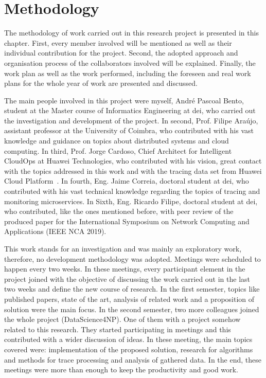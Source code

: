 \glsresetall
\chapter{Methodology}
\label{chap:methodology}

The methodology of work carried out in this research project is presented in this chapter. First, every member involved will be mentioned as well as their individual contribution for the project. Second, the adopted approach and organisation process of the collaborators involved will be explained. Finally, the work plan as well as the work performed, including the foreseen and real work plans for the whole year of work are presented and discussed.

The main people involved in this project were myself, André Pascoal Bento, student at the Master course of Informatics Engineering at \gls{dei}, who carried out the investigation and development of the project. In second, Prof. Filipe Araújo, assistant professor at the University of Coimbra, who contributed with his vast knowledge and guidance on topics about distributed systems and cloud computing. In third, Prof. Jorge Cardoso, Chief Architect for Intelligent CloudOps at Huawei Technologies, who contributed with his vision, great contact with the topics addressed in this work and with the tracing data set from Huawei Cloud Platform~\cite{huawei_cloud_platform}. In fourth, Eng. Jaime Correia, doctoral student at \gls{dei}, who contributed with his vast technical knowledge regarding the topics of tracing and monitoring microservices. In Sixth, Eng. Ricardo Filipe, doctoral student at \gls{dei}, who contributed, like the ones mentioned before, with peer review of the produced paper for the International Symposium on Network Computing and Applications (IEEE NCA 2019).

This work stands for an investigation and was mainly an exploratory work, therefore, no development methodology was adopted. Meetings were scheduled to happen every two weeks. In these meetings, every participant element in the project joined with the objective of discussing the work carried out in the last two weeks and define the new course of research. In the first semester, topics like published papers, state of the art, analysis of related work and a proposition of solution were the main focus. In the second semester, two more colleagues joined the whole project (DataScience4NP). One of them with a project somehow related to this research. They started participating in meetings and this contributed with a wider discussion of ideas. In these meeting, the main topics covered were: implementation of the proposed solution, research for algorithms and methods for trace processing and analysis of gathered data. In the end, these meetings were more than enough to keep the productivity and good work.

